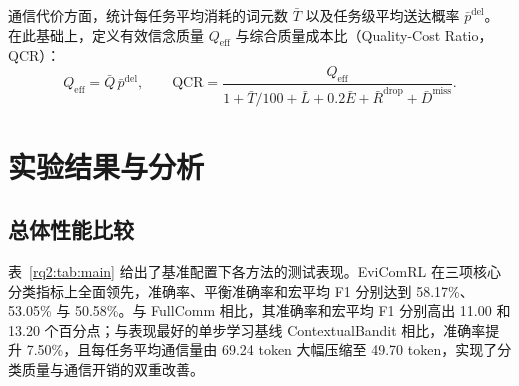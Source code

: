 通信代价方面，统计每任务平均消耗的词元数 $\bar T$ 以及任务级平均送达概率 $\bar p^{\mathrm{del}}$。在此基础上，定义有效信念质量 $Q_{\mathrm{eff}}$ 与综合质量成本比（Quality-Cost Ratio，QCR）：
\begin{equation}
Q_{\mathrm{eff}}=\bar Q\,\bar p^{\mathrm{del}},\qquad
\mathrm{QCR}=\frac{Q_{\mathrm{eff}}}
{1+\bar T/100+\bar L+0.2\bar E+\bar R^{\mathrm{drop}}+\bar D^{\mathrm{miss}}}.
\label{rq2:eq:qcr}
\end{equation}

\section{实验结果与分析}
\label{rq2:sec:results}

\subsection{总体性能比较}

表~\ref{rq2:tab:main} 给出了基准配置下各方法的测试表现。EviComRL 在三项核心分类指标上全面领先，准确率、平衡准确率和宏平均 F1 分别达到 58.17\%、53.05\% 与 50.58\%。与 FullComm 相比，其准确率和宏平均 F1 分别高出 11.00 和 13.20 个百分点；与表现最好的单步学习基线 ContextualBandit 相比，准确率提升 7.50\%，且每任务平均通信量由 69.24 token 大幅压缩至 49.70 token，实现了分类质量与通信开销的双重改善。

